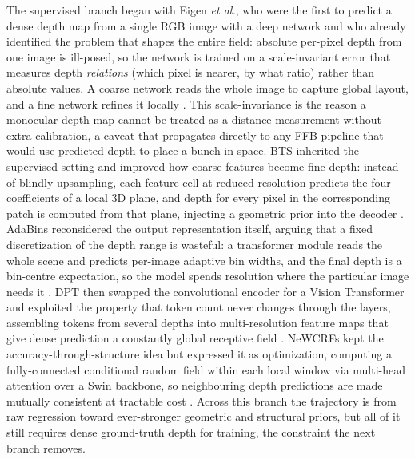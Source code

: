The supervised branch began with Eigen \textit{et al.}, who were the first to predict a dense depth map from a single RGB image with a deep network and who already identified the problem that shapes the entire field: absolute per-pixel depth from one image is ill-posed, so the network is trained on a scale-invariant error that measures depth \emph{relations} (which pixel is nearer, by what ratio) rather than absolute values. A coarse network reads the whole image to capture global layout, and a fine network refines it locally \cite{eigen2014depth}. This scale-invariance is the reason a monocular depth map cannot be treated as a distance measurement without extra calibration, a caveat that propagates directly to any FFB pipeline that would use predicted depth to place a bunch in space. BTS inherited the supervised setting and improved how coarse features become fine depth: instead of blindly upsampling, each feature cell at reduced resolution predicts the four coefficients of a local 3D plane, and depth for every pixel in the corresponding patch is computed from that plane, injecting a geometric prior into the decoder \cite{lee2019bts}. AdaBins reconsidered the output representation itself, arguing that a fixed discretization of the depth range is wasteful: a transformer module reads the whole scene and predicts per-image adaptive bin widths, and the final depth is a bin-centre expectation, so the model spends resolution where the particular image needs it \cite{bhat2021adabins}. DPT then swapped the convolutional encoder for a Vision Transformer and exploited the property that token count never changes through the layers, assembling tokens from several depths into multi-resolution feature maps that give dense prediction a constantly global receptive field \cite{ranftl2021dpt}. NeWCRFs kept the accuracy-through-structure idea but expressed it as optimization, computing a fully-connected conditional random field within each local window via multi-head attention over a Swin backbone, so neighbouring depth predictions are made mutually consistent at tractable cost \cite{yuan2022newcrfs}. Across this branch the trajectory is from raw regression toward ever-stronger geometric and structural priors, but all of it still requires dense ground-truth depth for training, the constraint the next branch removes.


